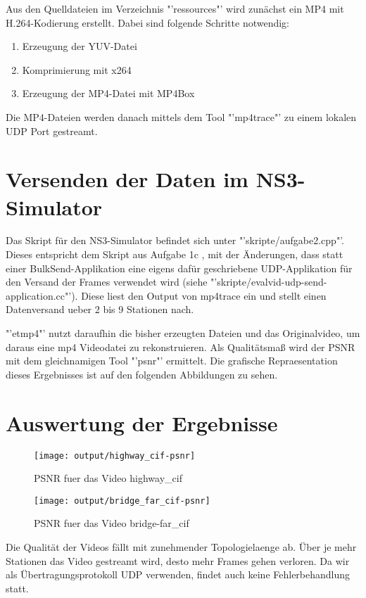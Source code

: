 \documentclass[12pt,a4paper,titlepage]{article}
\begin{document}
Aus den Quelldateien im Verzeichnis "'ressources"' wird zunächst ein MP4 mit H.264-Kodierung erstellt. Dabei sind folgende Schritte notwendig:
\begin{enumerate}
\item Erzeugung der YUV-Datei
\item Komprimierung mit x264
\item Erzeugung der MP4-Datei mit MP4Box
\end{enumerate}
Die MP4-Dateien werden danach mittels dem Tool "'mp4trace"' zu einem lokalen UDP Port gestreamt.


\section{Versenden der Daten im NS3-Simulator}

Das Skript für den NS3-Simulator befindet sich unter "'skripte/aufgabe2.cpp"'. Dieses entspricht dem Skript aus Aufgabe 1c , mit der Änderungen, dass statt einer BulkSend-Applikation eine eigens dafür geschriebene UDP-Applikation für den Versand der Frames verwendet wird (siehe "'skripte/evalvid-udp-send-application.cc"'). Diese liest den Output von mp4trace ein und stellt einen Datenversand ueber 2 bis 9 Stationen nach.

"'etmp4"' nutzt daraufhin die bisher erzeugten Dateien und das Originalvideo, um daraus eine mp4 Videodatei zu rekonstruieren. Als Qualitätsmaß wird der PSNR mit dem gleichnamigen Tool "'psnr"' ermittelt. Die grafische Repraesentation dieses Ergebnisses ist auf den folgenden Abbildungen zu sehen.

\section{Auswertung der Ergebnisse}

\begin{figure}[h]
	\centering
% 	
	\texttt{[image: output/highway\_cif-psnr]}
	\caption{PSNR fuer das Video highway\_cif}
	\label{fig:Durchsatz}
\end{figure}

\begin{figure}[h]
 	\centering
% 	
 	\texttt{[image: output/bridge\_far\_cif-psnr]}
 	\caption{PSNR fuer das Video bridge-far\_cif}
 	\label{fig:Durchsatz2}
\end{figure}

Die Qualität der Videos fällt mit zunehmender Topologielaenge ab. Über je mehr Stationen das Video gestreamt wird, desto mehr Frames gehen verloren. Da wir als Übertragungsprotokoll UDP verwenden, findet auch keine Fehlerbehandlung statt.
\end{document}
